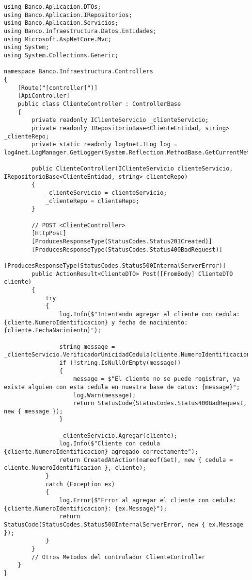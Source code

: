 \documentclass[executivepaper]{article}
\begin{document}
\begin{lstlisting}
using Banco.Aplicacion.DTOs;
using Banco.Aplicacion.IRepositorios;
using Banco.Aplicacion.Servicios;
using Banco.Infraestructura.Datos.Entidades;
using Microsoft.AspNetCore.Mvc;
using System;
using System.Collections.Generic;

namespace Banco.Infraestructura.Controllers
{
    [Route("[controller]")]
    [ApiController]
    public class ClienteController : ControllerBase
    {
        private readonly IClienteServicio _clienteServicio;
        private readonly IRepositorioBase<ClienteEntidad, string> _clienteRepo;
        private static readonly log4net.ILog log = log4net.LogManager.GetLogger(System.Reflection.MethodBase.GetCurrentMethod().DeclaringType);

        public ClienteController(IClienteServicio clienteServicio, IRepositorioBase<ClienteEntidad, string> clienteRepo)
        {
            _clienteServicio = clienteServicio;
            _clienteRepo = clienteRepo;
        }

        // POST <ClienteController>
        [HttpPost]
        [ProducesResponseType(StatusCodes.Status201Created)]
        [ProducesResponseType(StatusCodes.Status400BadRequest)]
        [ProducesResponseType(StatusCodes.Status500InternalServerError)]
        public ActionResult<ClienteDTO> Post([FromBody] ClienteDTO cliente)
        {
            try
            {
                log.Info($"Intentando agregar al cliente con cedula: {cliente.NumeroIdentificacion} y fecha de nacimiento: {cliente.FechaNacimiento}");

                string message = _clienteServicio.VerificadorUnicidadCedula(cliente.NumeroIdentificacion);
                if (!string.IsNullOrEmpty(message))
                {
                    message = $"El cliente no se puede registrar, ya existe alguien con esta cedula en nuestra base de datos: {message}";
                    log.Warn(message);
                    return StatusCode(StatusCodes.Status400BadRequest, new { message });
                }

                _clienteServicio.Agregar(cliente);
                log.Info($"Cliente con cedula {cliente.NumeroIdentificacion} agregado correctamente");
                return CreatedAtAction(nameof(Get), new { cedula = cliente.NumeroIdentificacion }, cliente);
            }
            catch (Exception ex)
            {
                log.Error($"Error al agregar el cliente con cedula: {cliente.NumeroIdentificacion}: {ex.Message}");
                return StatusCode(StatusCodes.Status500InternalServerError, new { ex.Message });
            }
        }
        // Otros Metodos del controlador ClienteController
    }
}
\end{lstlisting}
\end{document}
